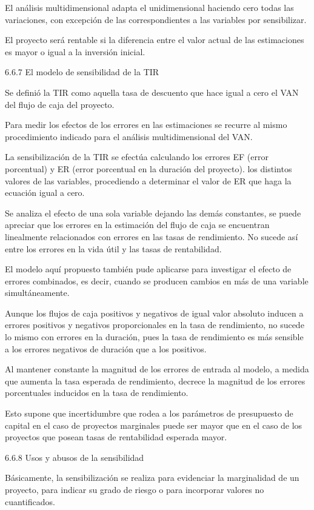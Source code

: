 El análisis multidimensional adapta el unidimensional haciendo cero todas las variaciones, con excepción de las correspondientes a las variables por sensibilizar.

El proyecto será rentable si la diferencia entre el valor actual de las estimaciones es mayor o igual a la inversión inicial.

6.6.7    El modelo de sensibilidad de la TIR

Se definió la TIR como aquella tasa de descuento que hace igual a cero el VAN del flujo de caja del proyecto.

Para medir los efectos de los errores en las estimaciones se recurre al mismo procedimiento indicado para el análisis multidimensional del VAN.

La sensibilización de la TIR se efectúa calculando los errores EF (error porcentual) y ER (error porcentual en la duración del proyecto). los distintos valores de las variables, procediendo a determinar el valor de ER que haga la ecuación igual a cero.

Se analiza el efecto de una sola variable dejando las demás constantes, se puede apreciar que los errores en la estimación del flujo de caja se encuentran linealmente relacionados con errores en las tasas de rendimiento. No sucede así entre los errores en la vida útil y las tasas de rentabilidad.

El modelo aquí propuesto también pude aplicarse para investigar el efecto de errores combinados, es decir, cuando se producen cambios en más de una variable simultáneamente.

Aunque los flujos de caja positivos y negativos de igual valor absoluto inducen a errores positivos y negativos proporcionales en la tasa de rendimiento, no sucede lo mismo con errores en la duración, pues la tasa de rendimiento es más sensible a los errores negativos de duración que a los positivos.

Al mantener constante la magnitud de los errores de entrada al modelo, a medida que aumenta la tasa esperada de rendimiento, decrece la magnitud de los errores porcentuales inducidos en la tasa de rendimiento.

Esto supone que incertidumbre que rodea a los parámetros de presupuesto de capital en el caso de proyectos marginales puede ser mayor que en el caso de los proyectos que posean tasas de rentabilidad esperada mayor.

6.6.8   Usos y abusos de la sensibilidad

Básicamente, la sensibilización se realiza para evidenciar la marginalidad de un proyecto, para indicar su grado de riesgo o para incorporar valores no cuantificados.

